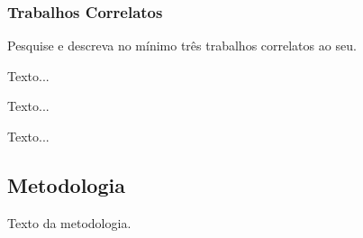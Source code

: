      
     \subsubsection{Trabalhos Correlatos}
     
     Pesquise e descreva no mínimo três trabalhos correlatos ao seu.
     
     
     Texto...
     
     
     Texto...
     
     
     Texto...
     
     
     \subsection{Metodologia}
     
     Texto da metodologia.
     
     
     
     
     

